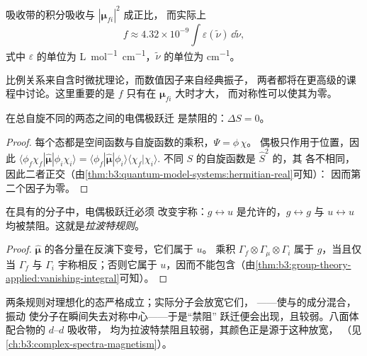 \begin{proposition}[吸收强度与振子强度]\label{prop:b3:electronic-spectroscopy:intensity}
吸收带的积分吸收与 $|\boldsymbol\mu_{fi}|^2$ 成正比，
而实际上
\[
f \approx 4.32\times10^{-9}\int\varepsilon(\tilde\nu)\,\dd\tilde\nu,
\]
式中 $\varepsilon$ 的单位为 \unit{L.mol^{-1}.cm^{-1}}，$\tilde\nu$ 的单位为 \unit{cm^{-1}}。
\end{proposition}
\admitted

比例关系来自含时微扰理论，而数值因子来自经典振子，
两者都将在更高级的课程中讨论。这里重要的是
$f$ 只有在 $\boldsymbol\mu_{fi}$ 大时才大，
而对称性可以使其为零。

\begin{theorem}[自旋选择定则]\label{thm:b3:electronic-spectroscopy:spin-rule}
在总自旋不同的两态之间的电偶极跃迁
是禁阻的：$\Delta S = 0$。
\end{theorem}

\begin{proof}
每个态都是空间函数与自旋函数的乘积，$\Psi = \phi\,\chi$。
偶极只作用于位置，因此 $\langle\phi_f\chi_f|\hat{\boldsymbol\mu}|
\phi_i\chi_i\rangle = \langle\phi_f|\hat{\boldsymbol\mu}|\phi_i\rangle\langle\chi_f|\chi_i\rangle$.
不同 $S$ 的自旋函数是 $\hat S^2$ 的，其
各不相同，因此二者正交（由\cref{thm:b3:quantum-model-systems:hermitian-real}可知）：
因而第二个因子为零。
\end{proof}

\begin{theorem}[拉波特规则]\label{thm:b3:electronic-spectroscopy:laporte}
在具有的分子中，电偶极跃迁必须
改变宇称：$g \leftrightarrow u$ 是允许的，$g \leftrightarrow g$ 与 $u
\leftrightarrow u$ 均被禁阻。这就是\emph{拉波特规则}。
\end{theorem}

\begin{proof}
$\hat{\boldsymbol\mu}$ 的各分量在反演下变号，它们属于 $u$。
乘积 $\Gamma_f\otimes\Gamma_\mu\otimes\Gamma_i$ 属于 $g$，当且仅当 $\Gamma_f$ 与 $\Gamma_i$
宇称相反；否则它属于 $u$，因而不能包含（由\cref{thm:b3:group-theory-applied:vanishing-integral}可知）。
\end{proof}

两条规则对理想化的态严格成立；实际分子会放宽它们，
——使与的成分混合，振动
使分子在瞬间失去对称中心——于是“禁阻”
跃迁便会出现，且较弱。八面体配合物的 $d$--$d$ 吸收带，
均为拉波特禁阻且较弱，其颜色正是源于这种放宽，
（见\cref{ch:b3:complex-spectra-magnetism}）。

